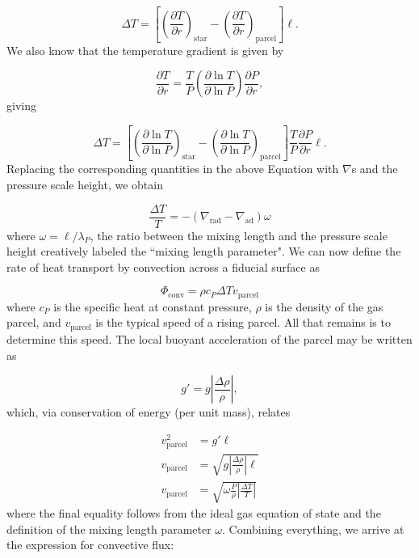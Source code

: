 \documentclass[12pt]{article}
\newcommand{\pderiv}[2]{\frac{\partial #1}{\partial #2}}
\newcommand{\bigparenthesis}[1]{\left(#1\right)}
\begin{document}
\begin{equation}
    \Delta T = \left[\bigparenthesis{\pderiv{T}{r}}_\mathrm{star} - \bigparenthesis{\pderiv{T}{r}}_\mathrm{parcel} \right] \ell.
\end{equation}
%
We also know that the temperature gradient is given by

\begin{equation}
    \pderiv{T}{r} = \frac{T}{P} \bigparenthesis{\pderiv{\ln T}{\ln P}} \pderiv{P}{r},
\end{equation}
%
giving

\begin{equation}
    \Delta T = \left[ \bigparenthesis{\pderiv{\ln T}{\ln P}}_\mathrm{star} - \bigparenthesis{\pderiv{\ln T}{\ln P}}_\mathrm{parcel} \right] \frac{T}{P} \pderiv{P}{r} \ell.
\end{equation}
%
Replacing the corresponding quantities in the above Equation with $\nabla$s and the pressure scale height, we obtain

\begin{equation}
    \frac{\Delta T}{T} = -\left(\nabla_\mathrm{rad} - \nabla_\mathrm{ad}\right) \omega
\end{equation}
%
where $\omega = \ell/\lambda_P$, the ratio between the mixing length and the pressure scale height creatively labeled the ``mixing length parameter". We can now define the rate of heat transport by convection across a fiducial surface as

\begin{equation}
    \Phi_\mathrm{conv} = \rho c_P \Delta T v_\mathrm{parcel}
\end{equation}
%
where $c_P$ is the specific heat at constant pressure, $\rho$ is the density of the gas parcel, and $v_\mathrm{parcel}$ is the typical speed of a rising parcel. All that remains is to determine this speed. The local buoyant acceleration of the parcel may be written as

\begin{equation}
    g' = g\left|\frac{\Delta \rho}{\rho}\right|,
\end{equation}
%
which, via conservation of energy (per unit mass), relates

\begin{align}
    v_\mathrm{parcel}^2 &= g' \ell \\
    v_\mathrm{parcel} &= \sqrt{g\left|\frac{\Delta \rho}{\rho}\right|\ell} \\
    v_\mathrm{parcel} &= \sqrt{\omega \frac{P}{\rho} \left|\frac{\Delta T}{T}\right|}
\end{align}
%
where the final equality follows from the ideal gas equation of state and the definition of the mixing length parameter $\omega$. Combining everything, we arrive at the expression for convective flux:
\end{document}
